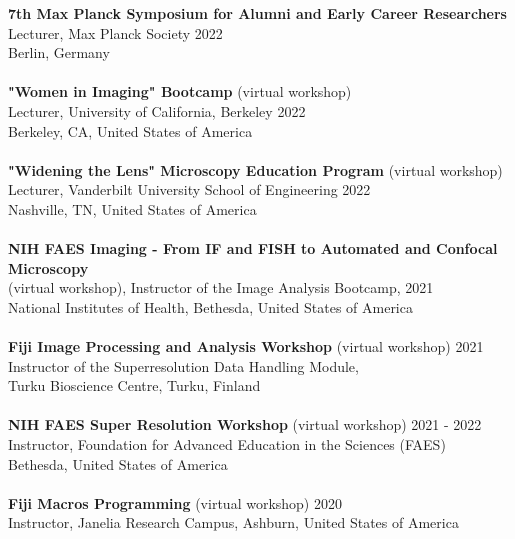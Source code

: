 \documentclass[margin,line]{res}
\begin{document}
\begin{resume}
{\bf  7th Max Planck Symposium for Alumni and Early Career Researchers}\\ Lecturer, Max Planck Society \hfill 2022\\
 Berlin, Germany\\
\vspace*{-3mm}\\
{\bf  "Women in Imaging" Bootcamp} (virtual workshop)\\ Lecturer, University of California, Berkeley \hfill 2022\\
 Berkeley, CA, United States of America\\
\vspace*{-3mm}\\
{\bf  "Widening the Lens" Microscopy Education Program} (virtual workshop)\\ Lecturer, Vanderbilt University School of Engineering \hfill 2022\\
 Nashville, TN, United States of America\\
\vspace*{-3mm}\\
{\bf  NIH FAES Imaging - From IF and FISH to Automated and Confocal Microscopy} \\(virtual workshop), Instructor of the Image Analysis Bootcamp,  \hfill 2021\\
 National Institutes of Health, Bethesda, United States of America\\
\vspace*{-3mm}\\
{\bf  Fiji Image Processing and Analysis Workshop} (virtual workshop)  \hfill 2021\\
Instructor of the Superresolution Data Handling Module, \\Turku Bioscience Centre, Turku, Finland\\
\vspace*{-3mm}\\
{\bf  NIH FAES Super Resolution Workshop} (virtual workshop)  \hfill 2021 - 2022\\
Instructor, Foundation for Advanced Education in the Sciences (FAES)\\
Bethesda, United States of America\\
\vspace*{-3mm}\\
{\bf Fiji Macros Programming} (virtual workshop)  \hfill 2020\\
Instructor, Janelia Research Campus, Ashburn, United States of America\\

\end{resume}
\end{document}
